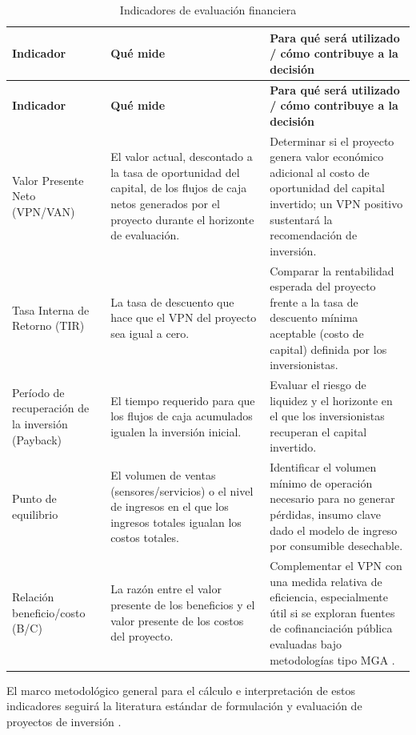 \documentclass[11pt,a4paper]{article}
\begin{document}
\begin{longtable}{L{3.6cm}L{5.5cm}L{5.5cm}}
\caption{Indicadores de evaluación financiera}\label{tab:indicadores}\\
\toprule
\textbf{Indicador} & \textbf{Qué mide} & \textbf{Para qué será utilizado / cómo contribuye a la decisión}\\
\midrule
\endfirsthead
\toprule
\textbf{Indicador} & \textbf{Qué mide} & \textbf{Para qué será utilizado / cómo contribuye a la decisión}\\
\midrule
\endhead
Valor Presente Neto (VPN/VAN) & El valor actual, descontado a la tasa de oportunidad del capital, de los flujos de caja netos generados por el proyecto durante el horizonte de evaluación. & Determinar si el proyecto genera valor económico adicional al costo de oportunidad del capital invertido; un VPN positivo sustentará la recomendación de inversión.\\
Tasa Interna de Retorno (TIR) & La tasa de descuento que hace que el VPN del proyecto sea igual a cero. & Comparar la rentabilidad esperada del proyecto frente a la tasa de descuento mínima aceptable (costo de capital) definida por los inversionistas.\\
Período de recuperación de la inversión (Payback) & El tiempo requerido para que los flujos de caja acumulados igualen la inversión inicial. & Evaluar el riesgo de liquidez y el horizonte en el que los inversionistas recuperan el capital invertido.\\
Punto de equilibrio & El volumen de ventas (sensores/servicios) o el nivel de ingresos en el que los ingresos totales igualan los costos totales. & Identificar el volumen mínimo de operación necesario para no generar pérdidas, insumo clave dado el modelo de ingreso por consumible desechable.\\
Relación beneficio/costo (B/C) & La razón entre el valor presente de los beneficios y el valor presente de los costos del proyecto. & Complementar el VPN con una medida relativa de eficiencia, especialmente útil si se exploran fuentes de cofinanciación pública evaluadas bajo metodologías tipo MGA \citep{dnp_mga2023}.\\
\bottomrule
\end{longtable}

\noindent El marco metodológico general para el cálculo e interpretación de estos indicadores seguirá la literatura estándar de formulación y evaluación de proyectos de inversión \citep{sapag2011}.

\end{document}
